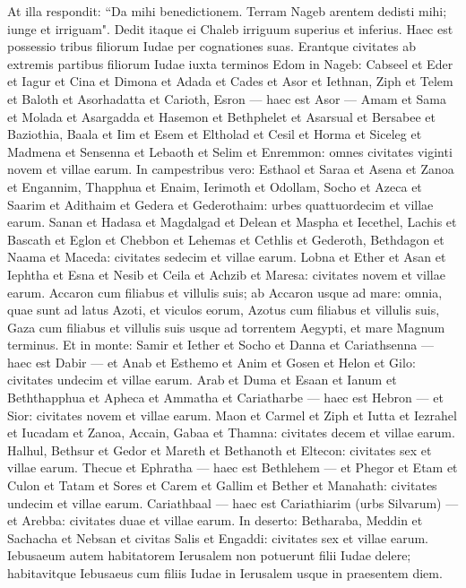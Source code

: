 \begin{biblechapter}
\verse At illa respondit: “Da mihi benedictionem. Terram Nageb arentem dedisti mihi; iunge et irriguam". Dedit itaque ei Chaleb irriguum superius et inferius. 
\verse Haec est possessio tribus filiorum Iudae per cognationes suas. 
\verse Erantque civitates ab extremis partibus filiorum Iudae iuxta terminos Edom in Nageb: Cabseel et Eder et Iagur 
\verse et Cina et Dimona et Adada 
\verse et Cades et Asor et Iethnan, 
\verse Ziph et Telem et Baloth 
\verse et Asorhadatta et Carioth, Esron — haec est Asor — 
\verse Amam et Sama et Molada 
\verse et Asargadda et Hasemon et Bethphelet 
\verse et Asarsual et Bersabee et Baziothia, 
\verse Baala et Iim et Esem 
\verse et Eltholad et Cesil et Horma 
\verse et Siceleg et Madmena et Sensenna 
\verse et Lebaoth et Selim et Enremmon: omnes civitates viginti novem et villae earum. 
\verse In campestribus vero: Esthaol et Saraa et Asena 
\verse et Zanoa et Engannim, Thapphua et Enaim, 
\verse Ierimoth et Odollam, Socho et Azeca 
\verse et Saarim et Adithaim et Gedera et Gederothaim: urbes quattuordecim et villae earum.  
\verse Sanan et Hadasa et Magdalgad 
\verse et Delean et Maspha et Iecethel, 
\verse Lachis et Bascath et Eglon 
\verse et Chebbon et Lehemas et Cethlis 
\verse et Gederoth, Bethdagon et Naama et Maceda: civitates sedecim et villae earum.  
\verse Lobna et Ether et Asan 
\verse et Iephtha et Esna et Nesib 
\verse et Ceila et Achzib et Maresa: civitates novem et villae earum. 
\verse Accaron cum filiabus et villulis suis; 
\verse ab Accaron usque ad mare: omnia, quae sunt ad latus Azoti, et viculos eorum, 
\verse Azotus cum filiabus et villulis suis, Gaza cum filiabus et villulis suis usque ad torrentem Aegypti, et mare Magnum terminus. 
\verse Et in monte: Samir et Iether et Socho 
\verse et Danna et Cariathsenna — haec est Dabir — 
\verse et Anab et Esthemo et Anim 
\verse et Gosen et Helon et Gilo: civitates undecim et villae earum. 
\verse Arab et Duma et Esaan 
\verse et Ianum et Beththapphua et Apheca 
\verse et Ammatha et Cariatharbe — haec est Hebron — et Sior: civitates novem et villae earum. 
\verse Maon et Carmel et Ziph et Iutta  
\verse et Iezrahel et Iucadam et Zanoa, 
\verse Accain, Gabaa et Thamna: civitates decem et villae earum. 
\verse Halhul, Bethsur et Gedor 
\verse et Mareth et Bethanoth et Eltecon: civitates sex et villae earum. Thecue et Ephratha — haec est Bethlehem — et Phegor et Etam et Culon et Tatam et Sores et Carem et Gallim et Bether et Manahath: civitates undecim et villae earum. 
\verse Cariathbaal — haec est Cariathiarim (urbs Silvarum) — et Arebba: civitates duae et villae earum. 
\verse In deserto: Betharaba, Meddin et Sachacha 
\verse et Nebsan et civitas Salis et Engaddi: civitates sex et villae earum. 
\verse Iebusaeum autem habitatorem Ierusalem non potuerunt filii Iudae delere; habitavitque Iebusaeus cum filiis Iudae in Ierusalem usque in praesentem diem. 
\end{biblechapter}

